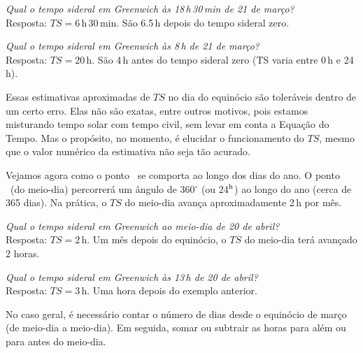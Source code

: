 \begin{exemplo}{1}
\textit{Qual o tempo sideral em Greenwich às 18\,h\,30\,min de 21 de março?}\\

Resposta: $TS = 6$\,h\,30\,min. São 6.5\,h depois do tempo sideral zero.
\end{exemplo}

\begin{exemplo}{2}
\textit{Qual o tempo sideral em Greenwich às 8\,h de 21 de março?}\\

Resposta: $TS = 20$\,h. São 4\,h antes do tempo sideral zero (TS varia entre 0\,h e 24\,h).
\end{exemplo}

Essas estimativas aproximadas de $TS$ no dia do equinócio são toleráveis dentro de um certo erro. Elas não são exatas, entre outros motivos, pois estamos misturando tempo solar com tempo civil, sem levar em conta a Equação do Tempo. Mas o propósito, no momento, é elucidar o funcionamento do $TS$, mesmo que o valor numérico da estimativa não seja tão acurado.

Vejamos agora como o ponto \Aries\ se comporta ao longo dos dias do ano. O ponto \Aries\ (do meio-dia) percorrerá um ângulo de 360$^{\circ}$ (ou 24$^{\rm h}$) ao longo do ano (cerca de 365 dias). Na prática, o $TS$ do meio-dia avança aproximadamente 2\,h por mês. \\

\begin{exemplo}{3}
\textit{Qual o tempo sideral em Greenwich ao meio-dia de 20 de abril?}\\

Resposta: $TS = 2$\,h. Um mês depois do equinócio, o $TS$ do meio-dia terá avançado 2 horas.
\end{exemplo}

\begin{exemplo}{5}
\textit{Qual o tempo sideral em Greenwich às 13\,h de 20 de abril?}\\

Resposta: $TS = 3$\,h. Uma hora depois do exemplo anterior.
\end{exemplo}

No caso geral, é necessário contar o número de dias desde o equinócio de março (de meio-dia a meio-dia). Em seguida, somar ou subtrair as horas para além ou para antes do meio-dia.\\



